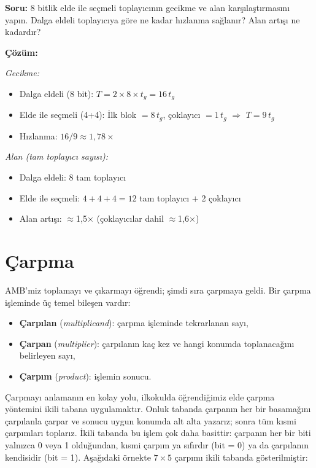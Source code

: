 \begin{ornek}[5.3]
\textbf{Soru:} 8 bitlik elde ile seçmeli toplayıcının gecikme ve alan karşılaştırmasını yapın. Dalga eldeli toplayıcıya göre ne kadar hızlanma sağlanır? Alan artışı ne kadardır?

\textbf{Çözüm:}

\emph{Gecikme:}
\begin{itemize}
  \item Dalga eldeli (8 bit): $T = 2 \times 8 \times t_g = 16\,t_g$
  \item Elde ile seçmeli (4+4): İlk blok $= 8\,t_g$, çoklayıcı $= 1\,t_g$ $\Rightarrow$ $T = 9\,t_g$
  \item Hızlanma: $16/9 \approx 1{,}78\times$
\end{itemize}

\emph{Alan (tam toplayıcı sayısı):}
\begin{itemize}
  \item Dalga eldeli: 8 tam toplayıcı
  \item Elde ile seçmeli: $4 + 4 + 4 = 12$ tam toplayıcı $+$ 2 çoklayıcı
  \item Alan artışı: $\approx$1{,}5$\times$ (çoklayıcılar dahil $\approx$1{,}6$\times$)
\end{itemize}
\end{ornek}

\section{Çarpma}
\label{sec:carpma}

AMB'miz toplamayı ve çıkarmayı öğrendi; şimdi sıra çarpmaya geldi. Bir çarpma işleminde üç temel bileşen vardır:
%
\begin{itemize}
\item \textbf{Çarpılan} (\emph{multiplicand}): çarpma işleminde tekrarlanan sayı,
\item \textbf{Çarpan} (\emph{multiplier}): çarpılanın kaç kez ve hangi konumda toplanacağını belirleyen sayı,
\item \textbf{Çarpım} (\emph{product}): işlemin sonucu.
\end{itemize}

Çarpmayı anlamanın en kolay yolu, ilkokulda öğrendiğimiz elde çarpma yöntemini ikili tabana uygulamaktır. Onluk tabanda çarpanın her bir basamağını çarpılanla çarpar ve sonucu uygun konumda alt alta yazarız; sonra tüm kısmi çarpımları toplarız. İkili tabanda bu işlem çok daha basittir: çarpanın her bir biti yalnızca 0 veya 1 olduğundan, kısmi çarpım ya sıfırdır (bit = 0) ya da çarpılanın kendisidir (bit = 1). Aşağıdaki örnekte $7 \times 5$ çarpımı ikili tabanda gösterilmiştir:

